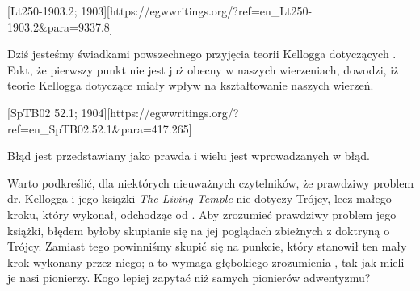 [Lt250-1903.2; 1903][https://egwwritings.org/?ref=en\_Lt250-1903.2&para=9337.8]

Dziś jesteśmy świadkami powszechnego przyjęcia teorii Kellogga dotyczących . Fakt, że pierwszy punkt  nie jest już obecny w naszych wierzeniach, dowodzi, iż teorie Kellogga dotyczące  miały wpływ na kształtowanie naszych wierzeń.

[SpTB02 52.1; 1904][https://egwwritings.org/?ref=en\_SpTB02.52.1&para=417.265]

Błąd jest przedstawiany jako prawda i wielu jest wprowadzanych w błąd.

Warto podkreślić, dla niektórych nieuważnych czytelników, że prawdziwy problem dr. Kellogga i jego książki \textit{The Living Temple} nie dotyczy Trójcy, lecz małego kroku, który wykonał, odchodząc od . Aby zrozumieć prawdziwy problem jego książki, błędem byłoby skupianie się na jej poglądach zbieżnych z doktryną o Trójcy. Zamiast tego powinniśmy skupić się na punkcie, który stanowił ten mały krok wykonany przez niego; a to wymaga głębokiego zrozumienia , tak jak mieli je nasi pionierzy. Kogo lepiej zapytać niż samych pionierów adwentyzmu?



